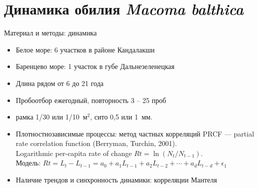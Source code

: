 \documentclass{beamer}
\begin{document}
		\section[Динамика обилия]{Динамика обилия {\it Macoma balthica}}
\begin{frame}{Материал и методы: динамика}
\begin{itemize}
	\item Белое море: 6 участков в районе Кандалакши
	\item Баренцево море: 1 участок в губе Дальнезеленецкая
	\item Длина рядом от 6 до 21 года
	\item Пробоотбор ежегодный, повторность 3 -- 25 проб
	\item рамка 1/30 или 1/10~м$^2$, сито 0,5 или 1~мм.
	\item Плотностнозависимые процессы: метод частных корреляций PRCF --- partial rate correlation function (Berryman, Turchin, 2001). \\
{\footnotesize Logarithmic per-capita rate of change $Rt =\ln(N_{t}/N_{t - 1})$. \\ Модель: $Rt = L_{t} - L_{t - 1} = a_{0} + a_{1}L_{t - 1} + a_{2}L_{t - 2} + \cdots + a_{d}L_{t - d} + \epsilon_{1}$}
	\item Наличие трендов и синхронность динамики: корреляции Мантеля
\end{itemize}
\end{frame}
\end{document}
